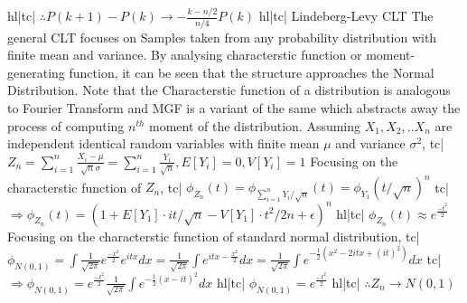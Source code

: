 hl|tc| \( \therefore P(k+1)-P(k) \rightarrow -\frac{k-n/2}{n/4}P(k) \)
hl|tc| Lindeberg-Levy CLT
The general CLT focuses on Samples taken from any probability distribution with finite mean and variance. By analysing characterstic function or moment-generating function, it can be seen that the structure approaches the Normal Distribution.
Note that the Characterstic function of a distribution is analogous to Fourier Transform and MGF is a variant of the same which abstracts away the process of computing \(n^{th}\) moment of the distribution.
Assuming \({X_1,X_2,..X_n}\) are independent identical random variables with finite mean \(\mu\) and variance \(\sigma^2\),
tc| \( Z_n = \sum_{i=1}^{n}\frac{X_i - \mu}{\sqrt{n}\sigma} = \sum_{i=1}^{n}\frac{Y_i}{\sqrt{n}}, E[Y_i] = 0, V[Y_i] = 1 \)
Focusing on the characterstic function of \(Z_n\),
tc| \( \phi_{Z_n}(t) = \phi_{\sum_{i=1}^{n}Y_i/\sqrt{n}}(t) = \phi_{Y_1}(t/\sqrt{n})^n \)
tc| \( \Rightarrow \phi_{Z_n}(t) = (1 + E[Y_1]\cdot it/\sqrt{n} - V[Y_1]\cdot t^2/2n + \epsilon)^n \)
hl|tc| \( \phi_{Z_n}(t) \approx e^{\frac{-t^2}{2}} \)
Focusing on the characterstic function of standard normal distribution,
tc| \( \phi_{N(0,1)} = \int \frac{1}{\sqrt{2\pi}} e^{\frac{-x^2}{2}} e^{itx} dx = \frac{1}{\sqrt{2\pi}} \int e^{itx  - \frac{x^2}{2}} dx = \frac{1}{\sqrt{2\pi}} \int e^{-\frac{1}{2} (x^2 - 2itx + (it)^2)} dx \)
tc| \( \Rightarrow \phi_{N(0,1)} = e^{\frac{-t^2}{2}} \frac{1}{\sqrt{2\pi}} \int e^{-\frac{1}{2} (x - it)^2} dx \)
hl|tc| \( \phi_{N(0,1)} = e^{\frac{-t^2}{2}} \)
hl|tc| \( \therefore Z_n \rightarrow N(0, 1) \)